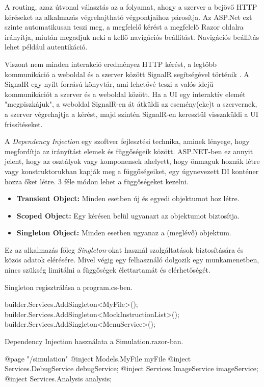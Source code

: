 A routing, azaz útvonal választás az a folyamat, ahogy a szerver a bejövő HTTP kéréseket az alkalmazás végrehajtható végpontjaihoz párosítja. Az ASP.Net ezt szinte automatikusan teszi meg, a megfelelő kérést a megfelelő Razor oldalra irányítja, miután megadjuk neki a kellő navigációs beállítást. Navigációs beállítás lehet például autentikáció.

Viszont nem minden interakció eredményez HTTP kérést, a legtöbb kommunikáció a weboldal és a szerver között SignalR segítségével történik \cite{signalr}. A SignalR egy nyílt forrású könyvtár, ami lehetővé teszi a valós idejű kommunikációt a szerver és a weboldal között. Ha a UI egy interaktív elemét "megpiszkájuk", a weboldal SignalR-en át átküldi az esemény(eke)t a szervernek, a szerver végrehajtja a kérést, majd szintén SignalR-en keresztül visszaküldi a UI frissítéseket.

A \textit{Dependency Injection} \cite{di} egy szoftver fejlesztési technika, aminek lényege, hogy megfordítja az irányítást elemek és függőségeik között. ASP.NET-ben ez annyit jelent, hogy az osztályok vagy komponensek ahelyett, hogy önmaguk hoznák létre vagy konstruktorukban kapják meg a függőségeiket, egy úgynevezett DI konténer hozza őket létre. 3 féle módon lehet a függőségeket kezelni.	
\begin{itemize}
\item\textbf{Transient Object:} Minden esetben új és egyedi objektumot hoz létre.
\item\textbf{Scoped Object:} Egy kérésen belül ugyanazt az objektumot biztosítja.
\item\textbf{Singleton Object:} Minden esetben ugyanaz a (meglévő) objektum.
\end{itemize}
Ez az alkalmazás főleg \textit{Singleton}-okat használ szolgáltatások biztosítására és közös adatok elérésére. Mivel végig egy felhasználó dolgozik egy munkamenetben, nincs szükség limitálni a függőségek élettartamát és elérhetőségét.

Singleton regisztrálása a program.cs-ben.
\begin{cpp}
builder.Services.AddSingleton<MyFile>();
builder.Services.AddSingleton<MockInstructionList>();
builder.Services.AddSingleton<MenuService>();
\end{cpp}

Dependency Injection használata a Simulation.razor-ban.
\begin{cpp}
@page "/simulation"
@inject Models.MyFile myFile
@inject Services.DebugService debugService;
@inject Services.ImageService imageService;
@inject Services.Analysis analysis;
\end{cpp}

